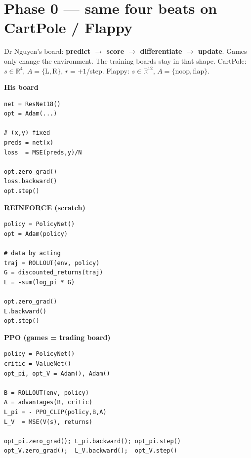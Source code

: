 \documentclass[10pt,a4paper]{article}
\begin{document}
\section*{Phase 0 --- same four beats on CartPole / Flappy}
\noindent\small
Dr Nguyen's board: \textbf{predict $\rightarrow$ score $\rightarrow$ differentiate $\rightarrow$ update}.
Games only change the environment. The training boards stay in that shape.
CartPole: $s\in\mathbb{R}^4$, $A=\{\mathrm{L},\mathrm{R}\}$, $r=+1$/step.
Flappy: $s\in\mathbb{R}^{12}$, $A=\{\mathrm{noop},\mathrm{flap}\}$.

\vspace{0.45em}
\noindent
\begin{minipage}[t]{0.32\textwidth}
\centering\textbf{His board}\par\vspace{0.25em}
\begin{Verbatim}[fontsize=\tiny,frame=single,framesep=3pt]
net = ResNet18()
opt = Adam(...)

# (x,y) fixed
preds = net(x)
loss  = MSE(preds,y)/N

opt.zero_grad()
loss.backward()
opt.step()
\end{Verbatim}
\end{minipage}\hfill
\begin{minipage}[t]{0.32\textwidth}
\centering\textbf{REINFORCE (scratch)}\par\vspace{0.25em}
\begin{Verbatim}[fontsize=\tiny,frame=single,framesep=3pt]
policy = PolicyNet()
opt = Adam(policy)

# data by acting
traj = ROLLOUT(env, policy)
G = discounted_returns(traj)
L = -sum(log_pi * G)

opt.zero_grad()
L.backward()
opt.step()
\end{Verbatim}
\end{minipage}\hfill
\begin{minipage}[t]{0.32\textwidth}
\centering\textbf{PPO (games = trading board)}\par\vspace{0.25em}
\begin{Verbatim}[fontsize=\tiny,frame=single,framesep=3pt]
policy = PolicyNet()
critic = ValueNet()
opt_pi, opt_V = Adam(), Adam()

B = ROLLOUT(env, policy)
A = advantages(B, critic)
L_pi = - PPO_CLIP(policy,B,A)
L_V  = MSE(V(s), returns)

opt_pi.zero_grad(); L_pi.backward(); opt_pi.step()
opt_V.zero_grad();  L_V.backward();  opt_V.step()
\end{Verbatim}
\end{minipage}
\end{document}
